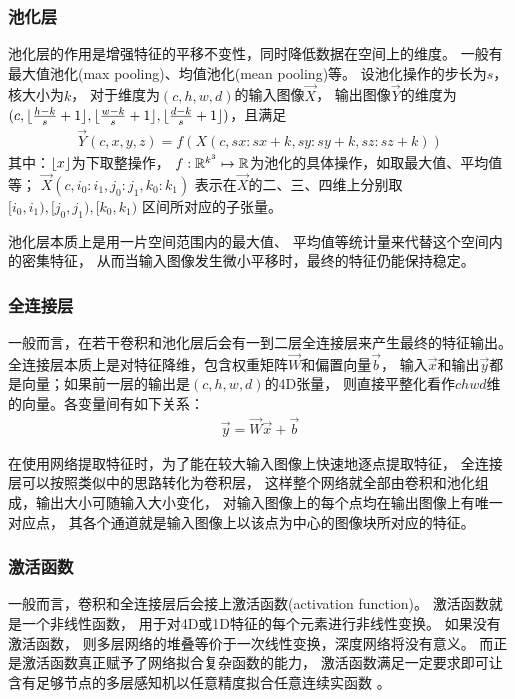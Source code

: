 \subsubsection{池化层}
池化层的作用是增强特征的平移不变性，同时降低数据在空间上的维度。
一般有最大值池化(max pooling)、均值池化(mean pooling)等。
设池化操作的步长为$s$，核大小为$k$，
对于维度为$(c, h, w, d)$的输入图像$\vec{X}$，
输出图像$\vec{Y}$的维度为$(c, \lfloor\frac{h-k}{s}+1\rfloor,
\lfloor\frac{w-k}{s}+1\rfloor, \lfloor\frac{d-k}{s}+1\rfloor)$，且满足
\begin{eqnarray}
    \vec{Y}(c, x, y, z) = f(X(c, sx:sx+k, sy:sy+k, sz:sz+k))
\end{eqnarray}
其中：$\lfloor x\rfloor$为下取整操作，
$f:\mathbb{R}^{k^3}\mapsto \mathbb{R}$为池化的具体操作，如取最大值、平均值等；
$\vec{X}(c, i_0:i_1, j_0:j_1, k_0:k_1)$
表示在$\vec{X}$的二、三、四维上分别取$[i_0, i_1), [j_0, j_1), [k_0, k_1)$
区间所对应的子张量。

池化层本质上是用一片空间范围内的最大值、
平均值等统计量来代替这个空间内的密集特征，
从而当输入图像发生微小平移时，最终的特征仍能保持稳定。


\subsubsection{全连接层}
一般而言，在若干卷积和池化层后会有一到二层全连接层来产生最终的特征输出。
全连接层本质上是对特征降维，包含权重矩阵$\vec{W}$和偏置向量$\vec{b}$，
输入$\vec{x}$和输出$\vec{y}$都是向量；如果前一层的输出是$(c,h,w,d)$的4D张量，
则直接平整化看作$chwd$维的向量。各变量间有如下关系：
\begin{eqnarray}
    \vec{y} = \vec{W}\vec{x} + \vec{b}
\end{eqnarray}

在使用网络提取特征时，为了能在较大输入图像上快速地逐点提取特征，
全连接层可以按照类似中的思路转化为卷积层，
这样整个网络就全部由卷积和池化组成，输出大小可随输入大小变化，
对输入图像上的每个点均在输出图像上有唯一对应点，
其各个通道就是输入图像上以该点为中心的图像块所对应的特征。

\subsubsection{激活函数}
一般而言，卷积和全连接层后会接上激活函数(activation function)。
激活函数就是一个非线性函数，
用于对4D或1D特征的每个元素进行非线性变换。
如果没有激活函数，
则多层网络的堆叠等价于一次线性变换，深度网络将没有意义。
而正是激活函数真正赋予了网络拟合复杂函数的能力，
激活函数满足一定要求即可让含有足够节点的多层感知机以任意精度拟合任意连续实函数
\cite{hornik1989multilayer}。

